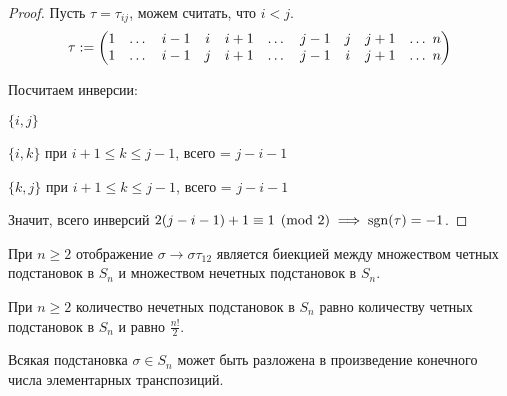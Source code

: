 \begin{proof}
    Пусть $\tau = \tau_{ij}$, можем считать, что $i < j$.
    \begin{equation*}
        \tau := \begin{pmatrix}
            1 & \dots & i-1 & i & i + 1 & \dots &
            j - 1 & j & j + 1 & \dots \ n
            \cr
            1 & \dots & i-1 & j & i + 1 & \dots &
            j - 1 & i & j + 1 & \dots \ n
        \end{pmatrix}
    \end{equation*}

    Посчитаем инверсии:

    $\{i, j\}$

    $\{i, k\}$ при $i + 1 \leq k \leq j -1$, всего = $j-i-1$

    $\{k, j\}$ при $i + 1 \leq k \leq j -1$, всего = $j-i-1$

    Значит, всего инверсий $2(j-i-1) + 1 \equiv 1 \pmod{2} \implies \operatorname{\mathop{\mathrm{sgn}}}(\tau) = -1$.
\end{proof}

\begin{corollary}
    При $n \geq 2$ отображение $\sigma \rightarrow \sigma \tau_{12}$ является биекцией между множеством четных подстановок в $S_n$ и множеством нечетных подстановок в $S_n$.
\end{corollary}

\begin{corollary}
    При $n \geq 2$ количество нечетных подстановок в $S_n$ равно количеству четных подстановок в $S_n$ и равно $\frac{n!}{2}$.
\end{corollary}

\begin{theorem}
    Всякая подстановка $\sigma \in S_n$ может быть разложена в произведение конечного числа элементарных транспозиций.
\end{theorem}

